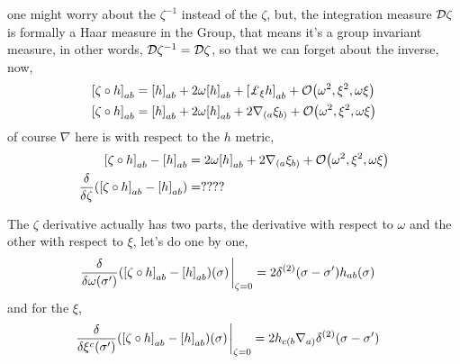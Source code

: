 one might worry about the $\zeta^{-1}$ instead of the $\zeta$, but, the integration measure $\mathcal D \zeta$ is formally a Haar measure in the Group, that means 
it's a group invariant measure, in other words, $\mathcal D \zeta^{-1}=\mathcal D \zeta$, so that we can forget about the inverse, now,
\begin{align*}
    \qty[\zeta\circ h]_{ab}&=\qty[h]_{ab}+2\omega\qty[h]_{ab}+\qty[\pounds_{\xi}h]_{ab}+\mathcal O\qty(\omega^2,\xi^2,\omega\xi)\\
    \qty[\zeta\circ h]_{ab}&=\qty[h]_{ab}+2\omega\qty[h]_{ab}+2\nabla_{(a}\xi_{b)}+\mathcal O\qty(\omega^2,\xi^2,\omega\xi)
\end{align*}
of course $\nabla$ here is with respect to the $h$ metric,
\begin{align*}
    \qty[\zeta\circ h]_{ab}-\qty[h]_{ab}&=2\omega\qty[h]_{ab}+2\nabla_{(a}\xi_{b)}+\mathcal O\qty(\omega^2,\xi^2,\omega\xi)\\
    \fdv{}{\zeta}\qty(\qty[\zeta\circ h]_{ab}-\qty[h]_{ab})&=????
\end{align*}

The $\zeta$ derivative actually has two parts, the derivative with respect to $\omega$ and the other with respect to $\xi$, let's do one by one,
\begin{align*}
    \fdv{}{\omega\qty(\sigma')}\qty(\qty[\zeta\circ h]_{ab}-\qty[h]_{ab})\qty(\sigma)\eval_{\zeta=0}&=2\delta^{\qty(2)}\qty(\sigma-\sigma')h_{ab}\qty(\sigma)
\end{align*}
and for the $\xi$,
\begin{align*}
    \fdv{}{\xi^c\qty(\sigma')}\qty(\qty[\zeta\circ h]_{ab}-\qty[h]_{ab})\qty(\sigma)\eval_{\zeta=0}&=2h_{c(b}\nabla_{a)}\delta^{\qty(2)}\qty(\sigma-\sigma')
\end{align*}

